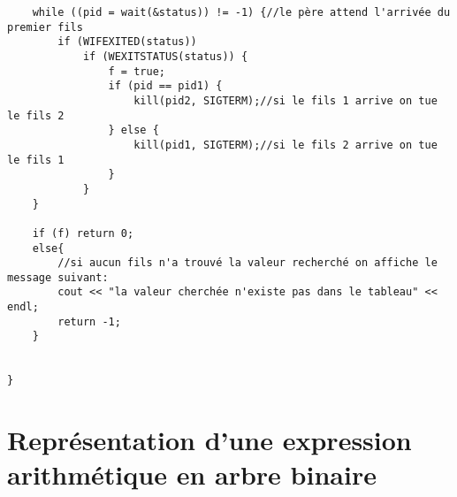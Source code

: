\begin{verbatim}
    while ((pid = wait(&status)) != -1) {//le père attend l'arrivée du premier fils
        if (WIFEXITED(status))
            if (WEXITSTATUS(status)) {
                f = true;
                if (pid == pid1) {
                    kill(pid2, SIGTERM);//si le fils 1 arrive on tue le fils 2
                } else {
                    kill(pid1, SIGTERM);//si le fils 2 arrive on tue le fils 1
                }
            }
    }

    if (f) return 0;
    else{
        //si aucun fils n'a trouvé la valeur recherché on affiche le message suivant:
        cout << "la valeur cherchée n'existe pas dans le tableau" << endl;
        return -1;
    }


}
\end{verbatim}

\section{Représentation d'une expression arithmétique en arbre binaire}

